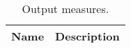 \begin{table}
\center
\begin{tabular} {| l | l |}
Name & Description \\ \hline



\end{tabular}
\caption[Table caption text]{Output measures. \label{tab:sa_measures}}
\end{table}